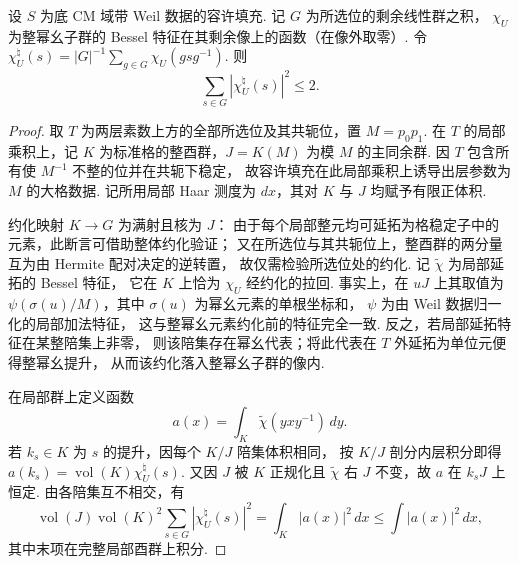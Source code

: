 \begin{lemma}[幂幺特征的共轭平均]
\label{lem:b-conjugation-l2}
\emitthmsource
设 $S$ 为底 CM 域带 Weil 数据的容许填充. 记 $G$ 为所选位的剩余线性群之积，
$\chi_U$ 为整幂幺子群的 Bessel 特征在其剩余像上的函数（在像外取零）.
令 $\chi_U^\natural(s)=|G|^{-1}\sum_{g\in G}\chi_U(gsg^{-1})$.
则
\[
 \sum_{s\in G}|\chi_U^\natural(s)|^2\le2.
\]
\end{lemma}
\begin{proof}
取 $T$ 为两层素数上方的全部所选位及其共轭位，置 $M=p_0p_1$.
在 $T$ 的局部乘积上，记 $K$ 为标准格的整酉群，$J=K(M)$ 为模 $M$ 的主同余群.
因 $T$ 包含所有使 $M^{-1}$ 不整的位并在共轭下稳定，
故容许填充在此局部乘积上诱导出层参数为 $M$ 的大格数据.
记所用局部 Haar 测度为 $dx$，其对 $K$ 与 $J$ 均赋予有限正体积.

约化映射 $K\to G$ 为满射且核为 $J$：
由于每个局部整元均可延拓为格稳定子中的元素，此断言可借助整体约化验证；
又在所选位与其共轭位上，整酉群的两分量互为由 Hermite 配对决定的逆转置，
故仅需检验所选位处的约化. 记 $\widetilde\chi$ 为局部延拓的 Bessel 特征，
它在 $K$ 上恰为 $\chi_U$ 经约化的拉回. 事实上，在
$uJ$ 上其取值为 $\psi(\sigma(u)/M)$，其中 $\sigma(u)$ 为幂幺元素的单根坐标和，
$\psi$ 为由 Weil 数据归一化的局部加法特征，
这与整幂幺元素约化前的特征完全一致. 反之，若局部延拓特征在某整陪集上非零，
则该陪集存在幂幺代表；将此代表在 $T$ 外延拓为单位元便得整幂幺提升，
从而该约化落入整幂幺子群的像内.

在局部群上定义函数
\[
 a(x)=\int_K\widetilde\chi(yxy^{-1})\,dy.
\]
若 $k_s\in K$ 为 $s$ 的提升，因每个 $K/J$ 陪集体积相同，
按 $K/J$ 剖分内层积分即得
$a(k_s)=\operatorname{vol}(K)\chi_U^\natural(s)$.
又因 $J$ 被 $K$ 正规化且 $\widetilde\chi$ 右 $J$ 不变，故 $a$ 在 $k_sJ$ 上恒定.
由各陪集互不相交，有
\[
 \operatorname{vol}(J)\operatorname{vol}(K)^2
       \sum_{s\in G}|\chi_U^\natural(s)|^2
 =\int_K |a(x)|^2\,dx
 \le\int |a(x)|^2\,dx ,
\]
其中末项在完整局部酉群上积分.


\end{proof}
